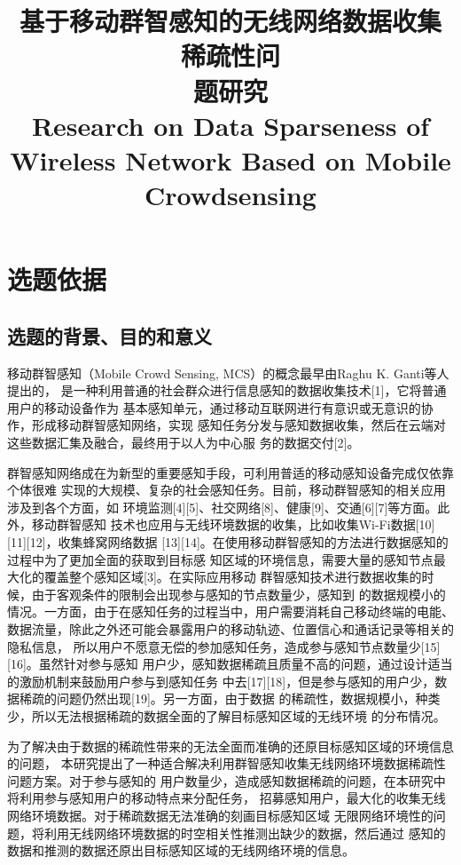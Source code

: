 \documentclass[UTF8]{ctexart}
\title{\textbf{基于移动群智感知的无线网络数据收集
       稀疏性问\\
       题研究\\
       Research on Data Sparseness of Wireless Network
       Based on Mobile\\
       Crowdsensing}}
\begin{document}
\maketitle
\section{选题依据}
\subsection{选题的背景、目的和意义}

移动群智感知（Mobile Crowd Sensing, MCS）的概念最早由Raghu K. Ganti等人提出的，
是一种利用普通的社会群众进行信息感知的数据收集技术[1]，它将普通用户的移动设备作为
基本感知单元，通过移动互联网进行有意识或无意识的协作，形成移动群智感知网络，实现
感知任务分发与感知数据收集，然后在云端对这些数据汇集及融合，最终用于以人为中心服
务的数据交付[2]。

群智感知网络成在为新型的重要感知手段，可利用普适的移动感知设备完成仅依靠个体很难
实现的大规模、复杂的社会感知任务。目前，移动群智感知的相关应用涉及到各个方面，如
环境监测[4][5]、社交网络[8]、健康[9]、交通[6][7]等方面。此外，移动群智感知
技术也应用与无线环境数据的收集，比如收集Wi-Fi数据[10][11][12]，收集蜂窝网络数据
[13][14]。在使用移动群智感知的方法进行数据感知的过程中为了更加全面的获取到目标感
知区域的环境信息，需要大量的感知节点最大化的覆盖整个感知区域[3]。在实际应用移动
群智感知技术进行数据收集的时候，由于客观条件的限制会出现参与感知的节点数量少，感知到
的数据规模小的情况。一方面，由于在感知任务的过程当中，用户需要消耗自己移动终端的电能、
数据流量，除此之外还可能会暴露用户的移动轨迹、位置信心和通话记录等相关的隐私信息，
所以用户不愿意无偿的参加感知任务，造成参与感知节点数量少[15][16]。虽然针对参与感知
用户少，感知数据稀疏且质量不高的问题，通过设计适当的激励机制来鼓励用户参与到感知任务
中去[17][18]，但是参与感知的用户少，数据稀疏的问题仍然出现[19]。另一方面，由于数据
的稀疏性，数据规模小，种类少，所以无法根据稀疏的数据全面的了解目标感知区域的无线环境
的分布情况。

为了解决由于数据的稀疏性带来的无法全面而准确的还原目标感知区域的环境信息的问题，
本研究提出了一种适合解决利用群智感知收集无线网络环境数据稀疏性问题方案。对于参与感知的
用户数量少，造成感知数据稀疏的问题，在本研究中将利用参与感知用户的移动特点来分配任务，
招募感知用户，最大化的收集无线网络环境数据。对于稀疏数据无法准确的刻画目标感知区域
无限网络环境性的问题，将利用无线网络环境数据的时空相关性推测出缺少的数据，然后通过
感知的数据和推测的数据还原出目标感知区域的无线网络环境的信息。
\end{document}

